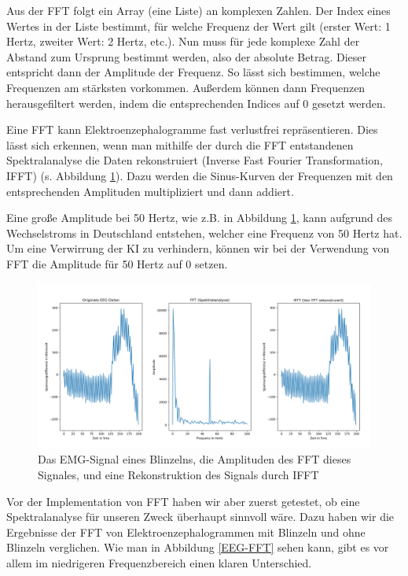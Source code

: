 \documentclass[11pt]{scrartcl}
\begin{document}
	Aus der FFT folgt ein Array (eine Liste) an komplexen Zahlen. Der Index eines Wertes in der Liste bestimmt, für welche Frequenz der Wert gilt (erster Wert: 1 Hertz, zweiter Wert: 2 Hertz, etc.). Nun muss für jede komplexe Zahl der Abstand zum Ursprung bestimmt werden, also der absolute Betrag. Dieser entspricht dann der Amplitude der Frequenz. So lässt sich bestimmen, welche Frequenzen am stärksten vorkommen. Außerdem können dann Frequenzen herausgefiltert werden, indem die entsprechenden Indices auf 0 gesetzt werden. 

	Eine FFT kann Elektroenzephalogramme fast verlustfrei repräsentieren. Dies lässt sich erkennen, wenn man mithilfe der durch die FFT entstandenen Spektralanalyse die Daten rekonstruiert (Inverse Fast Fourier Transformation, IFFT) (s. Abbildung \ref{EEG-IFFT}). Dazu werden die Sinus-Kurven der Frequenzen mit den entsprechenden Amplituden multipliziert und dann addiert.

	Eine große Amplitude bei 50 Hertz, wie z.B. in Abbildung \ref{EEG-IFFT}, kann aufgrund des Wechselstroms in Deutschland entstehen, welcher eine Frequenz von 50 Hertz hat. \cite{Praktikum} Um eine Verwirrung der KI zu verhindern, können wir bei der Verwendung von FFT die Amplitude für 50 Hertz auf 0 setzen.

	\begin{figure}[h!]
		\includegraphics[width=\textwidth]{pictures/blink_fft_ifft.png}
		\caption{Das EMG-Signal eines Blinzelns, die Amplituden des FFT dieses Signales, und eine Rekonstruktion des Signals durch IFFT}
		\label{EEG-IFFT}
	\end{figure}

	Vor der Implementation von FFT haben wir aber zuerst getestet, ob eine Spektralanalyse für unseren Zweck überhaupt sinnvoll wäre. Dazu haben wir die Ergebnisse der FFT von Elektroenzephalogrammen mit Blinzeln und ohne Blinzeln verglichen. Wie man in Abbildung \ref{EEG-FFT} sehen kann, gibt es vor allem im niedrigeren Frequenzbereich einen klaren Unterschied.
\end{document}

